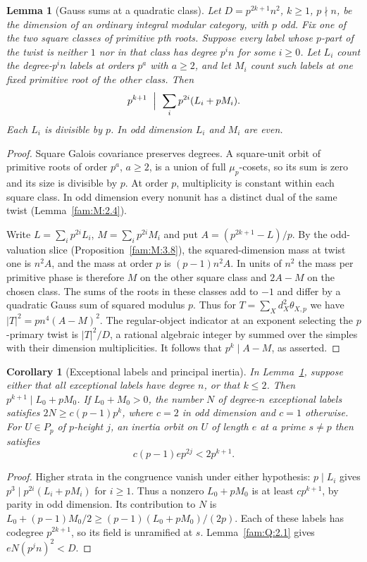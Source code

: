 \documentclass[11pt,a4paper]{article}
\numberwithin{equation}{section}
\newtheorem{lemma}[theorem]{Lemma}
\newtheorem{corollary}[theorem]{Corollary}
\theoremstyle{remark}
\begin{document}
\begin{lemma}[Gauss sums at a quadratic class]\label{fam:Q:5.1}\label{fam:Q:n:q12:stratified}
Let $D=p^{2k+1}n^2$, $k\ge1$, $p\nmid n$, be the dimension of
an ordinary integral modular category, with $p$ odd. Fix one of the
two square classes of primitive $p$th roots. Suppose every label
whose $p$-part of the twist is neither $1$ nor in that class has
degree $p^i n$ for some $i\ge0$. Let $L_i$ count the degree-$p^i n$
labels at orders $p^a$ with $a\ge2$, and let $M_i$ count such labels
at one fixed primitive root of the other class. Then
\[
 p^{k+1}\ \Bigm|\ \sum_i p^{2i}(L_i+pM_i).
\]
Each $L_i$ is divisible by $p$. In odd dimension $L_i$ and $M_i$
are even.
\end{lemma}
\begin{proof}
Square Galois covariance preserves degrees. A square-unit orbit of
primitive roots of order $p^a$, $a\ge2$, is a union of full
$\mu_p$-cosets, so its sum is zero and its size is divisible by $p$.
At order $p$, multiplicity is constant within each square class.
In odd dimension every nonunit has a distinct dual of the same
twist (Lemma~\ref{fam:M:2.4}).

Write $L=\sum_i p^{2i}L_i$, $M=\sum_i p^{2i}M_i$ and put
$A=(p^{2k+1}-L)/p$. By the odd-valuation slice
(Proposition~\ref{fam:M:3.8}), the squared-dimension mass at twist
one is $n^2 A$, and the mass at order $p$ is $(p-1)n^2 A$.
In units of $n^2$ the mass per primitive phase is therefore $M$
on the other square class and $2A-M$ on the chosen class.
The sums of the roots in these classes add to $-1$ and differ
by a quadratic Gauss sum of squared modulus $p$. Thus for
$T=\sum_Xd_X^2\theta_{X,p}$ we have $|T|^2=p n^4(A-M)^2$.
The regular-object indicator at an exponent selecting the
$p$-primary twist is $|T|^2/D$, a rational algebraic integer
by \cite[Theorem~7.5]{NSfs} summed over the simples with their dimension multiplicities. It follows that $p^k\mid A-M$, as asserted.
\end{proof}

\begin{corollary}[Exceptional labels and principal inertia]\label{fam:Q:6.6}\label{fam:Q:n:quart:gauss}\label{fam:Q:6.7}\label{fam:Q:n:quart:orbitcount}
In Lemma~\ref{fam:Q:5.1}, suppose either that all exceptional labels
have degree $n$, or that $k\le2$. Then $p^{k+1}\mid L_0+pM_0$.
If $L_0+M_0>0$, the number $N$ of degree-$n$ exceptional labels satisfies
$2N\ge c(p-1)p^k$, where $c=2$ in odd dimension and $c=1$ otherwise.
For $U\in P_p$ of $p$-height $j$, an inertia orbit on $U$ of
length $e$ at a prime $s\ne p$ then satisfies
\[
                       c(p-1)e p^{2j}<2p^{k+1}.
\]
\end{corollary}
\begin{proof}
Higher strata in the congruence vanish under either hypothesis:
$p\mid L_i$ gives $p^3\mid p^{2i}(L_i+pM_i)$ for $i\ge1$.
Thus a nonzero $L_0+pM_0$ is at least $cp^{k+1}$, by parity in
odd dimension. Its contribution to $N$ is
$L_0+(p-1)M_0/2\ge(p-1)(L_0+pM_0)/(2p)$.
Each of these labels has codegree $p^{2k+1}$, so its field is
unramified at $s$. Lemma~\ref{fam:Q:2.1} gives $eN(p^jn)^2<D$.
\end{proof}
\end{document}

